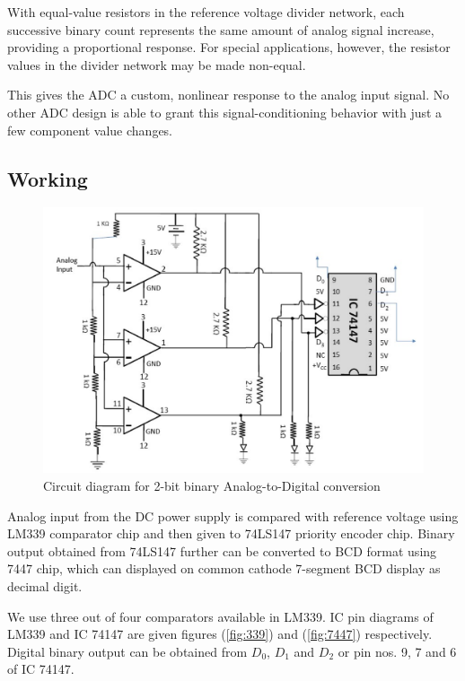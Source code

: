 \documentclass[%
 reprint,
nofootinbib,
 amsmath,amssymb,
 aps,
floatfix,
]{revtex4-2}
\begin{document}
    \par
    With equal-value resistors in the reference voltage divider network, each successive binary count represents the same amount of analog signal increase, providing a proportional response. For special applications, however, the resistor values in the divider network may be made non-equal.
    \par
    This gives the ADC a custom, nonlinear response to the analog input signal. No other ADC design is able to grant this signal-conditioning behavior with just a few component value changes.
    \subsection{Working}
    \begin{figure}
        \centering
        \includegraphics[scale = 0.35]{Figures/adc.png}
        \caption{Circuit diagram for 2-bit binary Analog-to-Digital conversion}
        \label{fig:ADC}
    \end{figure}
    Analog input from the DC power supply is compared with reference voltage using LM339 comparator chip and then given to 74LS147 priority encoder chip. Binary output obtained from 74LS147 further can be converted to BCD format using 7447 chip, which can displayed on common cathode 7-segment BCD display as decimal digit.
    \par
    We use three out of four comparators available in LM339. IC pin diagrams of LM339 and IC 74147 are given figures (\ref{fig:339}) and (\ref{fig:7447}) respectively. Digital binary output can be obtained from $D_0$, $D_1$ and $D_2$ or pin nos. 9, 7 and 6 of IC 74147.
\end{document}
